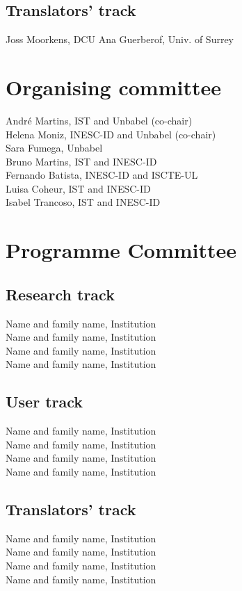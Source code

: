 \documentclass[a4paper,11pt,twoside]{book}
\begin{document}
\subsection*{Translators' track}
\noindent Joss Moorkens, DCU
\noindent Ana Guerberof, Univ. of Surrey

\section*{Organising committee}
\noindent André Martins, IST and Unbabel (co-chair)\\
\noindent Helena Moniz, INESC-ID and Unbabel (co-chair)\\
\noindent Sara Fumega, Unbabel\\
\noindent Bruno Martins, IST and INESC-ID\\
\noindent Fernando Batista, INESC-ID and ISCTE-UL\\
\noindent Luisa Coheur, IST and INESC-ID\\
\noindent Isabel Trancoso, IST and INESC-ID


\section*{Programme Committee}
\subsection*{Research track}
\noindent Name and family name, Institution\\
\noindent Name and family name, Institution\\
\noindent Name and family name, Institution\\
\noindent Name and family name, Institution

\subsection*{User track}
\noindent Name and family name, Institution\\
\noindent Name and family name, Institution\\
\noindent Name and family name, Institution\\
\noindent Name and family name, Institution

\subsection*{Translators' track}
\noindent Name and family name, Institution\\
\noindent Name and family name, Institution\\
\noindent Name and family name, Institution\\
\noindent Name and family name, Institution
\end{document}

